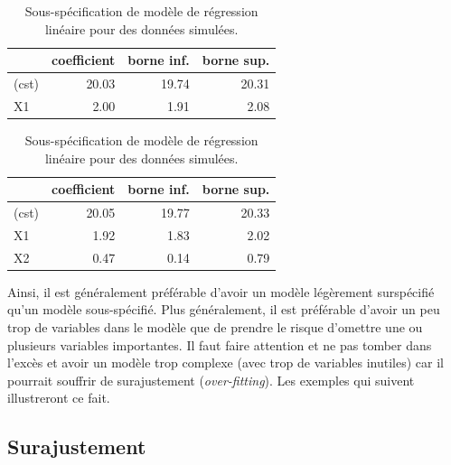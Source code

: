 \documentclass[
  11pt,
  letterpaper,
]{scrbook}
\theoremstyle{definition}
\theoremstyle{remark}
\begin{document}
\begin{table}

\caption{\label{tbl-specification2}Sous-spécification de modèle de
régression linéaire pour des données
simulées.}\begin{minipage}[t]{\linewidth}

{\centering 

\centering
\begin{tabular}[t]{lrrr}
\toprule
  & coefficient & borne inf. & borne sup.\\
\midrule
(cst) & 20.03 & 19.74 & 20.31\\
X1 & 2.00 & 1.91 & 2.08\\
\bottomrule
\end{tabular}

}

\end{minipage}%
\newline
\begin{minipage}[t]{\linewidth}

{\centering 

\centering
\begin{tabular}[t]{lrrr}
\toprule
  & coefficient & borne inf. & borne sup.\\
\midrule
(cst) & 20.05 & 19.77 & 20.33\\
X1 & 1.92 & 1.83 & 2.02\\
X2 & 0.47 & 0.14 & 0.79\\
\bottomrule
\end{tabular}

}

\end{minipage}%

\end{table}

Ainsi, il est généralement préférable d'avoir un modèle légèrement
surspécifié qu'un modèle sous-spécifié. Plus généralement, il est
préférable d'avoir un peu trop de variables dans le modèle que de
prendre le risque d'omettre une ou plusieurs variables importantes. Il
faut faire attention et ne pas tomber dans l'excès et avoir un modèle
trop complexe (avec trop de variables inutiles) car il pourrait souffrir
de surajustement (\emph{over-fitting}). Les exemples qui suivent
illustreront ce fait.

\hypertarget{surajustement}{%
\subsection{Surajustement}\label{surajustement}}
\end{document}
